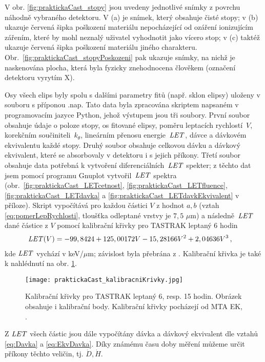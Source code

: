 V obr. \ref{fig:praktickaCast_stopy} jsou uvedeny jednotlivé snímky z povrchu náhodně vybraného detektoru. V (a) je snímek, který obsahuje čisté stopy; v (b) ukazuje červená šipka poškození materiálu nepocházející od ozáření ionizujícím zářením, které by mohl neznalý uživatel vyhodnotit jako vícero stop; v (c) taktéž ukazuje červená šipka poškození materiálu jiného charakteru. Obr.~\ref{fig:praktickaCast_stopyPoskozeni} pak ukazuje snímky, na nichž je naskenována plocha, která byla fyzicky znehodnocena člověkem (označení detektoru vyrytím X). 

Osy všech elips byly spolu s dalšími parametry fitů (např. sklon elipsy) uloženy v souboru s příponou .nap. Tato data byla zpracována skriptem napsaném v programovacím jazyce Python, jehož výstupem jsou tři soubory. První soubor obsahuje údaje o poloze stopy, os fitované elipsy, poměru leptacích rychlostí~$V$, korekčním součiniteli~$k_{\theta}$, lineárním přenosu energie~$\mathit{LET}$, dávce a dávkovém ekvivalentu každé stopy. Druhý soubor obsahuje celkovou dávku a dávkový ekvivalent, které se absorbovaly v detektoru i s jejich příkony. Třetí soubor obsahuje data potřebná k vytvoření diferenciálních~$\mathit{LET}$ spekter; z těchto dat jsem pomocí programu Gnuplot vytvořil~$\mathit{LET}$ spektra (obr.~\ref{fig:praktickaCast_LETcetnost}, \ref{fig:praktickaCast_LETfluence},
\ref{fig:praktickaCast_LETdavka} a \ref{fig:praktickaCast_LETdavkEkvivalent} v příloze). Skript vypočítává pro každou částici $V$ z hodnot $a,b$ (vztah \eqref{eq:pomerLepRychlosti}, tloušťka odleptané vrstvy je $7,5$
$\mu$m) a následně~$\mathit{LET}$ dané částice z $V$ pomocí kalibrační křivky pro TASTRAK leptaný 6 hodin
\begin{align}
  \mathit{LET}(V) &= -99,8424+125,00172  V-15,28166  V^2+2,04636  V^3\,,\label{eq:kalibracniKrivkaSestHod}
\end{align}
kde $\mathit{LET}$ vychází v keV/$\mu$m; závislost byla přebrána z \cite{ssntd}. Kalibrační křivka je také k nahlédnutí na obr. \ref{fig:praktickaCast_kalibracniKrivky}.
\begin{figure}[ht]
  \centering
  \texttt{[image: praktickaCast\_kalibracniKrivky.jpg]}
  \caption{Kalibrační křivky pro TASTRAK leptaný 6, resp. 15 hodin. Obrázek obsahuje i kalibrační body. Kalibrační křivky pocházejí od MTA EK, \cite{ssntd}.}
  \label{fig:praktickaCast_kalibracniKrivky}
\end{figure}
Z $\mathit{LET}$ všech částic jsou dále vypočítány dávka a dávkový ekvivalent dle vztahů \eqref{eq:Davka} a \eqref{eq:EkvDavka}. Díky známému času doby měření můžeme určit příkony těchto veličin, tj. $\dot{D}, \dot{H}$.

